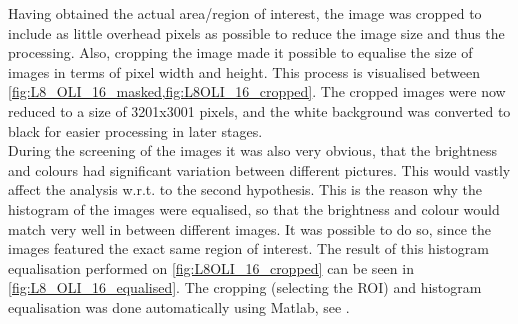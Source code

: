 Having obtained the actual area/region of interest, the image was cropped to include as little overhead pixels as possible to reduce the image size and thus the processing. Also, cropping the image made it possible to equalise the size of images in terms of pixel width and height. This process is visualised between \cref{fig:L8_OLI_16_masked,fig:L8OLI_16_cropped}. The cropped images were now reduced to a size of 3201x3001 pixels, and the white background was converted to black for easier processing in later stages. \\
During the screening of the images it was also very obvious, that the brightness and colours had significant variation between different pictures. This would vastly affect the analysis w.r.t. to the second hypothesis. This is the reason why the histogram of the images were equalised, so that the brightness and colour would match very well in between different images. It was possible to do so, since the images featured the exact same region of interest. The result of this histogram equalisation performed on \cref{fig:L8OLI_16_cropped} can be seen in \cref{fig:L8_OLI_16_equalised}.
The cropping (selecting the ROI) and histogram equalisation was done automatically using Matlab, see .


